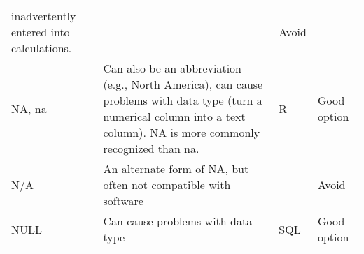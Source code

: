 \begin{longtable}[c]{@{}llll@{}}
\begin{minipage}[t]{0.23\columnwidth}
inadvertently entered into calculations.
\end{minipage} & \begin{minipage}[t]{0.17\columnwidth}\raggedright
\end{minipage} & \begin{minipage}[t]{0.18\columnwidth}\raggedright
Avoid
\end{minipage}
\\\addlinespace
\begin{minipage}[t]{0.10\columnwidth}\raggedright
NA, na
\end{minipage} & \begin{minipage}[t]{0.23\columnwidth}\raggedright
Can also be an abbreviation (e.g., North America), can cause problems
with data type (turn a numerical column into a text column). NA is more
commonly recognized than na.
\end{minipage} & \begin{minipage}[t]{0.17\columnwidth}\raggedright
R
\end{minipage} & \begin{minipage}[t]{0.18\columnwidth}\raggedright
Good option
\end{minipage}
\\\addlinespace
\begin{minipage}[t]{0.10\columnwidth}\raggedright
N/A
\end{minipage} & \begin{minipage}[t]{0.23\columnwidth}\raggedright
An alternate form of NA, but often not compatible with software
\end{minipage} & \begin{minipage}[t]{0.17\columnwidth}\raggedright
\end{minipage} & \begin{minipage}[t]{0.18\columnwidth}\raggedright
Avoid
\end{minipage}
\\\addlinespace
\begin{minipage}[t]{0.10\columnwidth}\raggedright
NULL
\end{minipage} & \begin{minipage}[t]{0.23\columnwidth}\raggedright
Can cause problems with data type
\end{minipage} & \begin{minipage}[t]{0.17\columnwidth}\raggedright
SQL
\end{minipage} & \begin{minipage}[t]{0.18\columnwidth}\raggedright
Good option
\end{minipage}

\end{longtable}
